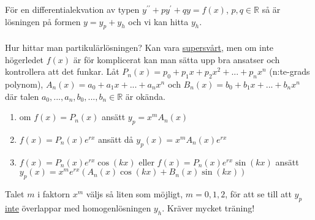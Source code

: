 För en differentialekvation av typen $y^{\prime\prime}+py^\prime+qy=f(x)$, $p,q\in\mathbb{R}$ så är lösningen på formen $y=y_p+y_h$ och vi kan hitta $y_h$.
\\
\\
Hur hittar man partikulärlösningen?
Kan vara \underline{supersvårt}, men om inte högerledet $f(x)$ är för komplicerat kan man sätta upp bra ansatser och kontrollera att det funkar.
Låt $P_n(x)=p_0+p_1x+p_2x^2+...+p_nx^n$ (n:te-grads polynom), $A_n(x)=a_0+a_1x+...+a_nx^n$ och $B_n(x)=b_0+b_1x+...+b_nx^n$ där talen $a_0,...,a_n,b_0,...,b_n\in\mathbb{R}$ är okända.
\begin{enumerate}
    \item om $f(x)=P_n(x)$ ansätt $y_p=x^m A_n(x)$
    \item $f(x)=P_n(x)e^{rx}$ ansätt då $y_p(x)=x^mA_n(x)e^{rx}$
    \item $f(x)=P_n(x)e^{rx}\cos(kx)$ eller $f(x)=P_n(x)e^{rx}\sin(kx)$ ansätt $y_p(x)=x^m e^{rx}(A_n(x)\cos(kx)+B_n(x)\sin(kx))$
\end{enumerate}
Talet $m$ i faktorn $x^m$ väljs så liten som möjligt, $m=0,1,2$, för att se till att $y_p$ \underline{inte} överlappar med homogenlösningen $y_h$.
Kräver mycket träning!


